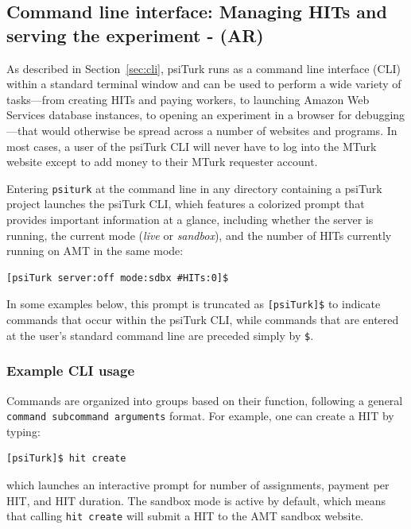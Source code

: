 \documentclass[twocolumn]{svjour3}          %
\newcommand{\psiturk}[0]{\textsf{psiTurk}}
\begin{document}
\subsection{Command line interface: Managing HITs and serving the experiment - (AR)}

As described in Section~\ref{sec:cli}, \psiturk{} runs as a command line interface
(CLI) within a standard terminal window and can be used to perform a wide
variety of tasks---from creating HITs and paying workers, to launching Amazon
Web Services database instances, to opening an experiment in a browser for
debugging---that would otherwise be spread across a number of websites and
programs. In most cases, a user of the \psiturk{} CLI will never have to log into
the MTurk website except to add money to their MTurk requester account.

Entering
\texttt{psiturk} at the command line in any directory containing a \psiturk{} project launches the
\psiturk{} CLI, whieh features a colorized prompt that provides important information at a glance, including
whether the server is running, the current mode (\emph{live} or \emph{sandbox}), and the number of HITs currently running on AMT in the same mode:

\begin{lstlisting}
[psiTurk server:off mode:sdbx #HITs:0]$
\end{lstlisting}

\noindent In some examples below, this prompt is truncated as \texttt{[psiTurk]\$} to indicate commands that occur within the \psiturk{} CLI, while commands that are entered at the user's standard command line are preceded simply by \texttt{\$}.

\subsubsection{Example CLI usage}
Commands are organized into groups based on their function, following a general \texttt{command subcommand
arguments} format. For example, one can create a HIT by typing: 

\begin{lstlisting}
[psiTurk]$ hit create
\end{lstlisting}

\noindent which launches an interactive prompt for number of assignments, payment per HIT, and HIT duration. The sandbox mode is active by default, which means that calling \texttt{hit create} will submit a HIT to the AMT sandbox website.
\end{document}

